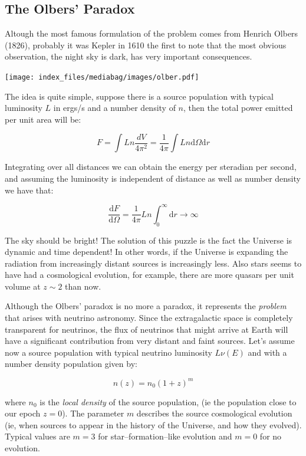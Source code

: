 \documentclass[
  letterpaper,
  DIV=11,
  numbers=noendperiod]{scrreprt}
\begin{document}
\subsection{The Olbers' Paradox}\label{the-olbers-paradox}

Altough the most famous formulation of the problem comes from Henrich
Olbers (1826), probably it was Kepler in 1610 the first to note that the
most obvious observation, the night sky is dark, has very important
consequences.

\texttt{[image: index\_files/mediabag/images/olber.pdf]}

The idea is quite simple, suppose there is a source population with
typical luminosity \(L\) in ergs/s and a number density of \(n\), then
the total power emitted per unit area will be:

\[ F = \int L n \frac{dV}{4\pi^2} = \frac{1}{4\pi}\int L n \mathrm{ d}\Omega \mathrm{ d}r\]

Integrating over all distances we can obtain the energy per steradian
per second, and assuming the luminosity is independent of distance as
well as number density we have that:

\[\frac{\mathrm{ d} F}{\mathrm{ d}\Omega} = \frac{1}{4\pi} L n \int_0^{\infty} \mathrm{ d}r \rightarrow \infty\]

The sky should be bright! The solution of this puzzle is the fact the
Universe is dynamic and time dependent! In other words, if the Universe
is expanding the radiation from increasingly distant sources is
increasingly less. Also stars seems to have had a cosmological
evolution, for example, there are more quasars per unit volume at
\(z \sim 2\) than now.

Although the Olbers' paradox is no more a paradox, it represents the
\emph{problem} that arises with neutrino astronomy. Since the
extragalactic space is completely transparent for neutrinos, the flux of
neutrinos that might arrive at Earth will have a significant
contribution from very distant and faint sources. Let's assume now a
source population with typical neutrino luminosity \(L\nu(E)\) and with
a number density population given by:

\[n(z) = n_0 (1+z)^m\]

where \(n_0\) is the \emph{local density} of the source population, (ie
the population close to our epoch \(z = 0\)). The parameter \(m\)
describes the source cosmological evolution (ie, when sources to appear
in the history of the Universe, and how they evolved). Typical values
are \(m= 3\) for star--formation--like evolution and \(m=0\) for no
evolution.
\end{document}
